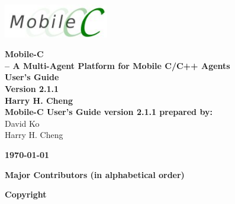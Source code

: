\documentclass[11pt]{report}
\begin{document}
\thispagestyle{empty}
\begin{center}
\includegraphics[width=1.8in]{figure/mobilec_logo.png}


\vspace{0.5in}
{\Huge\sf\bf Mobile-C} \\
\vspace{0.1in}
{\LARGE\sf\bf -- A Multi-Agent Platform for Mobile C/C++ Agents} \\
\vspace{0.4in}
{\LARGE\sf\bf User's Guide} \\
\vspace{0.4in}
{\LARGE\sf\bf Version 2.1.1} \\
\vspace{1.0in}
{\Large\sf\bf Harry H. Cheng} \\
\vspace{1.0in}
{\large\sf\bf Mobile-C User's Guide version 2.1.1 prepared by:} \\
\vspace{0.2in}
David Ko\\
Harry H. Cheng
\vspace{1in}

\vspace{2.0in}
{\large\sf\bf\today}
\end{center}

\pagebreak
\noindent
{\LARGE\sf\bf Major Contributors (in alphabetical order)} \\
{\small

}
\pagebreak


\thispagestyle{empty}
\noindent
{\Large\bf Copyright}\\


\pagebreak
\end{document}
